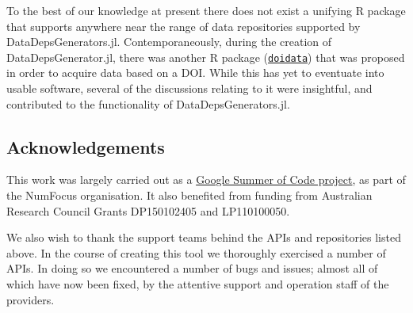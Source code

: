 \documentclass{book}
\begin{document}
To the best of our knowledge at present there does not exist a unifying R package that supports anywhere near the range of data repositories supported by DataDepsGenerators.jl. Contemporaneously, during the creation of DataDepsGenerator.jl, there was another R package (\href{https://github.com/ropenscilabs/doidata}{\texttt{doidata}}) that was proposed in order to acquire data based on a DOI. While this has yet to eventuate into usable software, several of the discussions relating to it were insightful, and contributed to the functionality of DataDepsGenerators.jl.


\subsection{Acknowledgements}

This work was largely carried out as a
\href{https://medium.com/@sebastinsanty/google-summer-of-code-2018-julia-computing-report-8d3f553d7050}{Google
Summer of Code project}, as part of the NumFocus organisation. It also
benefited from funding from Australian Research Council Grants
DP150102405 and LP110100050.

We also wish to thank the support teams behind the APIs and repositories
listed above. In the course of creating this tool we thoroughly
exercised a number of APIs. In doing so we encountered a number of bugs
and issues; almost all of which have now been fixed, by the attentive
support and operation staff of the providers.
\end{document}
